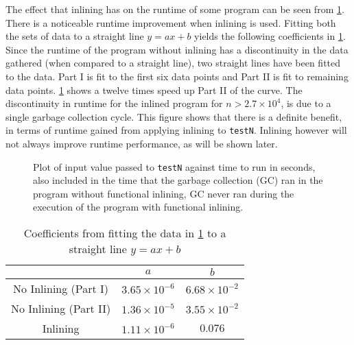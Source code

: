 \documentclass[float=false, crop=false]{standalone}
\newlength\gwidth
\newlength\gheight
\newcommand{\importMGraph}[3]{\setlength{\gwidth}{#2}\setlength{\gheight}{#3}{#1}}
\begin{document}
The effect that inlining has on the runtime of some program can be seen from
\cref{plot:inlinePlot}. 
 There is a noticeable runtime improvement when inlining is used.
Fitting both the sets of data to a straight line $y=ax+b$ yields the following
coefficients in \cref{table:inlineCoef}. Since the runtime of the program without inlining
has a discontinuity in the data gathered (when compared to a straight line), two straight lines have been
fitted to the data. Part I is fit to the first six data points and Part II is fit to remaining data points.
\cref{table:inlineCoef} shows a twelve times speed up Part II of the curve.
  The discontinuity in runtime for the inlined program for $n > 2.7 \times 10^{4}$, 
  is due to a single garbage collection cycle.
  This figure shows that there is a definite benefit, 
  in terms of runtime gained from applying inlining to \texttt{testN}. Inlining however
  will not always improve runtime performance, as will be shown later. 
\begin{figure}
\begin{samepage}
  \centering
  \importMGraph{inlinePlotComplex}{0.96\textwidth}{0.4\textwidth}
  \caption[Runtime of \texttt{testN} as a function on input size $n$]
  {Plot of input value passed to \texttt{testN} against time to run in seconds,
    also included in the time that the garbage collection (GC) ran in the program 
    without functional inlining, GC never ran during the execution of the 
    program with functional inlining.}
  \label{plot:inlinePlot}
\end{samepage}
\end{figure}

\begin{table}
  \centering
\begin{tabular}{c | c  c}
  & $a$ & $b$\\
  \hline 
  No Inlining (Part I) & $3.65\times 10^{-6}$ & $6.68 \times 10^{-2}$\\
  No Inlining (Part II) & $1.36\times 10^{-5}$ & $3.55 \times 10^{-2}$\\
  Inlining & $1.11\times 10^{-6}$ & $0.076$
\end{tabular}
\caption{Coefficients from fitting the data in \cref{plot:inlinePlot} to 
  a straight line $y=ax+b$}
  \label{table:inlineCoef}
\end{table}
\end{document}
